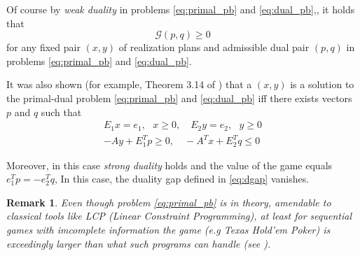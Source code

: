 \documentclass{article} %
\newtheorem{remark}{Remark}
\begin{document}
Of course by \textit{weak duality} in problems \eqref{eq:primal_pb} and \eqref{eq:dual_pb},, it holds that
\begin{equation}
  \mathcal{G}(p, q) \geq 0
\end{equation}
for any fixed pair $(x, y)$ of realization plans and admissible dual pair $(p,q)$ in problems \eqref{eq:primal_pb} and \eqref{eq:dual_pb}.

It was also shown (for example, Theorem 3.14 of \cite{vonequilibrium}) that a $(x, y)$ is a solution to the primal-dual problem \eqref{eq:primal_pb} and \eqref{eq:dual_pb} iff there exists vectors $p$ and $q$ such that
\begin{equation}
  \begin{split}
    E_1x = e_1,\text{ }x \geq 0,\hspace{1em} E_2y = e_2,\text{ }y \geq 0\\
    -Ay + E_1^Tp \geq 0,\hspace{1em}-A^Tx + E_2^Tq \leq 0
    \end{split}
\end{equation}

Moreover, in this case \textit{strong duality} holds and the value of the game equals $e_1^Tp = -e_2^Tq$,
In this case, the duality gap defined in \eqref{eq:dgap} vanishes.


\begin{remark}  
  Even though problem \eqref{eq:primal_pb} is in theory, amendable to classical tools like LCP (\textit{Linear Constraint Programming}), at least for sequential games with imcomplete information the game (e.g Texas Hold'em Poker) is exceedingly larger than what such programs can handle (see \cite{hoda2010smoothing}).
\end{remark}

\end{document}
